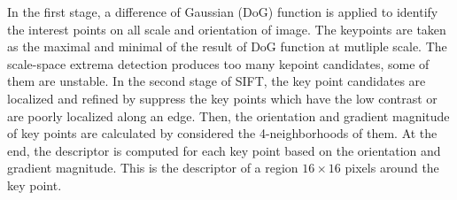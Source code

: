 \documentclass{gretsi}
\begin{document}
In the first stage, a difference of Gaussian (DoG) \cite{davidson2006molecular}  function is applied to identify the interest points on all scale and orientation of image. The keypoints are taken as the maximal and minimal of the result of DoG function at mutliple scale.
The scale-space extrema detection produces too many kepoint candidates, some of them are unstable. In the second stage of SIFT, the key point candidates are localized and refined by suppress the key points which have the low contrast or are poorly localized along an edge. 
Then, the orientation and gradient magnitude of key points are calculated by considered the 4-neighborhoods of them.
At the end, the descriptor is computed for each key point based on the orientation and gradient magnitude. This is the descriptor of a region $16 \times 16$ pixels around the key point.
\end{document}

